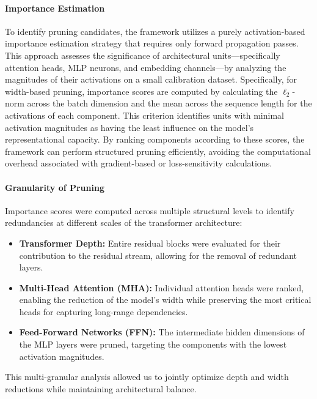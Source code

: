 \documentclass{article}
\begin{document}
\paragraph{Importance Estimation}
To identify pruning candidates, the framework utilizes a purely activation-based importance estimation strategy that requires only forward propagation passes. This approach assesses the significance of architectural units—specifically attention heads, MLP neurons, and embedding channels—by analyzing the magnitudes of their activations on a small calibration dataset. Specifically, for width-based pruning, importance scores are computed by calculating the $\ell_2$-norm across the batch dimension and the mean across the sequence length for the activations of each component. This criterion identifies units with minimal activation magnitudes as having the least influence on the model's representational capacity. By ranking components according to these scores, the framework can perform structured pruning efficiently, avoiding the computational overhead associated with gradient-based or loss-sensitivity calculations.

\paragraph{Granularity of Pruning}
Importance scores were computed across multiple structural levels to identify redundancies at different scales of the transformer architecture: 

\begin{itemize} 
\item \textbf{Transformer Depth:} Entire residual blocks were evaluated for their contribution to the residual stream, allowing for the removal of redundant layers. 
\item \textbf{Multi-Head Attention (MHA):} Individual attention heads were ranked, enabling the reduction of the model's width while preserving the most critical heads for capturing long-range dependencies. 
\item \textbf{Feed-Forward Networks (FFN):} The intermediate hidden dimensions of the MLP layers were pruned, targeting the components with the lowest activation magnitudes. 
\end{itemize}

This multi-granular analysis allowed us to jointly optimize depth and width reductions while maintaining architectural balance.
\end{document}
